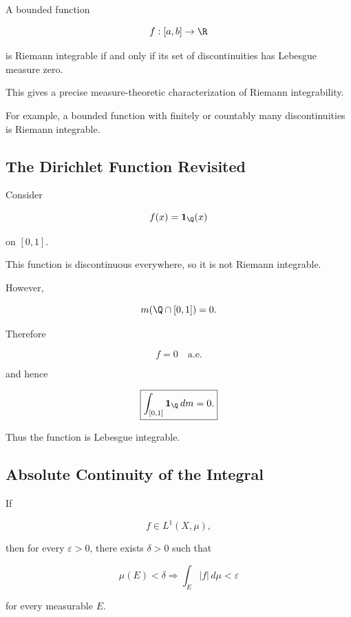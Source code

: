 \begin{theorem}
A bounded function

\[
f:[a,b]\to\R
\]

is Riemann integrable if and only if its set of discontinuities has
Lebesgue measure zero.
\end{theorem}

This gives a precise measure-theoretic characterization of Riemann
integrability.

For example, a bounded function with finitely or countably many
discontinuities is Riemann integrable.

\subsection{The Dirichlet Function Revisited}
\label{subsec:dirichlet-lebesgue-integral}

Consider

\[
f(x)
=
\mathbf{1}_{\Q}(x)
\]

on \([0,1]\).

This function is discontinuous everywhere, so it is not Riemann
integrable.

However,

\[
m(\Q\cap[0,1])=0.
\]

Therefore

\[
f=0
\quad\text{a.e.}
\]

and hence

\[
\boxed{
\int_{[0,1]}
\mathbf{1}_{\Q}\,dm
=
0.
}
\]

Thus the function is Lebesgue integrable.

\subsection{Absolute Continuity of the Integral}
\label{subsec:absolute-continuity-integral}

\begin{theorem}
If

\[
f\in L^1(X,\mu),
\]

then for every \(\varepsilon>0\), there exists \(\delta>0\) such that

\[
\boxed{
\mu(E)<\delta
\Longrightarrow
\int_E|f|\,d\mu<\varepsilon
}
\]

for every measurable \(E\).
\end{theorem}

